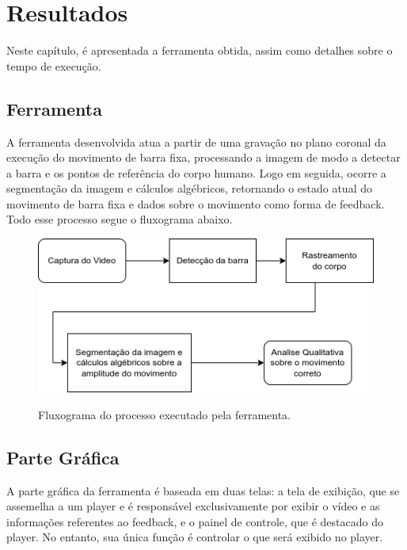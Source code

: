 \chapter{Resultados}

Neste capítulo, é apresentada a ferramenta obtida, assim como detalhes sobre o tempo de execução.

\section[Ferramenta]{Ferramenta}

A ferramenta desenvolvida atua a partir de uma gravação no plano coronal da execução do movimento de barra fixa, processando a imagem de modo a detectar a barra e os pontos de referência do corpo humano. Logo em seguida, ocorre a segmentação da imagem e cálculos algébricos, retornando o estado atual do movimento de barra fixa e dados sobre o movimento como forma de feedback. Todo esse processo segue o fluxograma abaixo.

\begin{figure}[!htb]
	\centering
  \caption{Fluxograma do processo executado pela ferramenta.}
	\includegraphics[scale=0.7]{figuras/diagrama/processo.png}
	\label{fig:fluxo}
\end{figure}


\section[Parte Gráfica]{Parte Gráfica}

A parte gráfica da ferramenta é baseada em duas telas: a tela de exibição, que se assemelha a um player e é responsável exclusivamente por exibir o vídeo e as informações referentes ao feedback, e o painel de controle, que é destacado do player. No entanto, sua única função é controlar o que será exibido no player.

